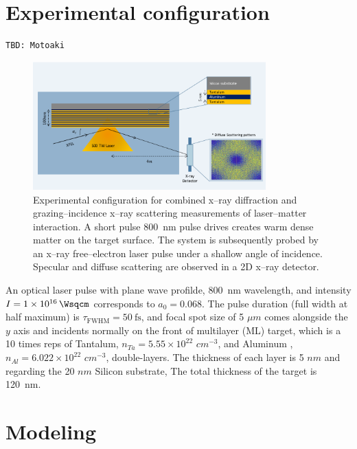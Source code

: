 \documentclass[preprint, 12pt]{elsarticle}
\begin{document}
\section{Experimental configuration\label{sec:Experiment}}
\begin{verbatim}
TBD: Motoaki
\end{verbatim}
%
\begin{figure}[ht]
  \begin{center}
    \includegraphics[width=0.8\textwidth,angle=0,clip]{figures/experiment_setup.png}
  \end{center}
  \caption{Experimental configuration for combined x--ray diffraction and
    grazing--incidence x--ray scattering measurements of laser--matter
    interaction. A short pulse \SI{800}{\nm} pulse drives creates warm dense
    matter on the target surface. The system is subsequently probed by an x--ray
    free--electron laser pulse under a shallow angle of incidence. Specular and
    diffuse scattering are observed in a 2D x--ray detector.
  }
  \label{fig:experiment_setup}
\end{figure}
%
An optical laser pulse with plane wave profilde, \SI{800}{\nm} wavelength, and intensity $I =
\SI{1e16}{\Wsqcm}$ corresponds to $a_{0} = 0.068$. The pulse duration (full
width at half maximum) is $\tau_\text{FWHM}=\SI{50}{\fs}$, and focal spot size of 5 $\mu m$  comes
alongside the $y$ axis and incidents normally on the front of multilayer (ML)
target, which is a 10 times reps of Tantalum, $n_{Ta} = 5.55 \times 10^{22}$
$cm^{-3}$, and Aluminum ,$n_{Al} = 6.022 \times 10^{22}$ $cm^{-3}$,
double-layers. The thickness of each layer is 5 $nm$ and regarding the 20 $nm$
Silicon substrate,
The total thickness of the target is \SI{120}{\nm}.
%
\section{Modeling\label{sec:Theory}}
\end{document}

